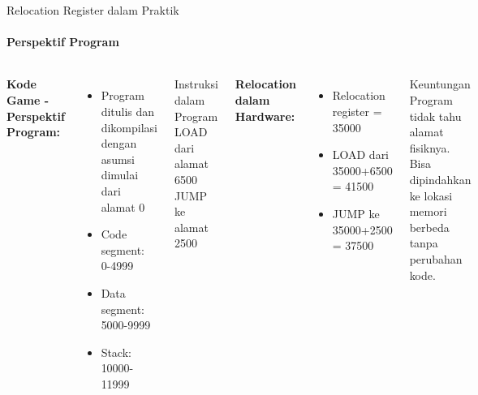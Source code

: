 \documentclass[10pt,aspectratio=169]{beamer}
\begin{document}
\begin{frame}{Relocation Register dalam Praktik}
    \framesubtitle{Perspektif Program}
    
    \begin{columns}[T]
            \textbf{Kode Game - Perspektif Program:}
            \begin{itemize}
                \item Program ditulis dan dikompilasi dengan asumsi dimulai dari alamat 0
                \item Code segment: 0-4999
                \item Data segment: 5000-9999
                \item Stack: 10000-11999
            \end{itemize}
            \begin{block}{Instruksi dalam Program}
                LOAD dari alamat 6500 \\
                JUMP ke alamat 2500
            \end{block}
            
            \textbf{Relocation dalam Hardware:}
            \begin{itemize}
                \item Relocation register = 35000
                \item LOAD dari 35000+6500 = 41500
                \item JUMP ke 35000+2500 = 37500
            \end{itemize}
            \begin{alertblock}{Keuntungan}
                Program tidak tahu alamat fisiknya. Bisa dipindahkan ke lokasi memori berbeda tanpa perubahan kode.
            \end{alertblock}
    \end{columns}
\end{frame}
\end{document}

